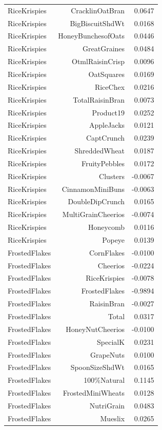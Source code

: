\begin{longtable}{@{}lrr@{}}
RiceKrispies & CracklinOatBran & 0.0647 \\
RiceKrispies & BigBiscuitShdWt & 0.0168 \\
RiceKrispies & HoneyBunchesofOats & 0.0446 \\
RiceKrispies & GreatGraines & 0.0484 \\
RiceKrispies & OtmlRaisinCrisp & 0.0096 \\
RiceKrispies & OatSquares & 0.0169 \\
RiceKrispies & RiceChex & 0.0216 \\
RiceKrispies & TotalRaisinBran & 0.0073 \\
RiceKrispies & Product19 & 0.0252 \\
RiceKrispies & AppleJacks & 0.0121 \\
RiceKrispies & CaptCrunch & 0.0239 \\
RiceKrispies & ShreddedWheat & 0.0187 \\
RiceKrispies & FruityPebbles & 0.0172 \\
RiceKrispies & Clusters & -0.0067 \\
RiceKrispies & CinnamonMiniBuns & -0.0063 \\
RiceKrispies & DoubleDipCrunch & 0.0165 \\
RiceKrispies & MultiGrainCheerios & -0.0074 \\
RiceKrispies & Honeycomb & 0.0116 \\
RiceKrispies & Popeye & 0.0139 \\
FrostedFlakes & CornFlakes & -0.0100 \\
FrostedFlakes & Cheerios & -0.0224 \\
FrostedFlakes & RiceKrispies & -0.0078 \\
FrostedFlakes & FrostedFlakes & -0.9894 \\
FrostedFlakes & RaisinBran & -0.0027 \\
FrostedFlakes & Total & 0.0317 \\
FrostedFlakes & HoneyNutCheerios & -0.0100 \\
FrostedFlakes & SpecialK & 0.0231 \\
FrostedFlakes & GrapeNuts & 0.0100 \\
FrostedFlakes & SpoonSizeShdWt & 0.0165 \\
FrostedFlakes & 100\%Natural & 0.1145 \\
FrostedFlakes & FrostedMiniWheats & 0.0128 \\
FrostedFlakes & NutriGrain & 0.0483 \\
FrostedFlakes & Mueslix & 0.0265 \\

\end{longtable}
